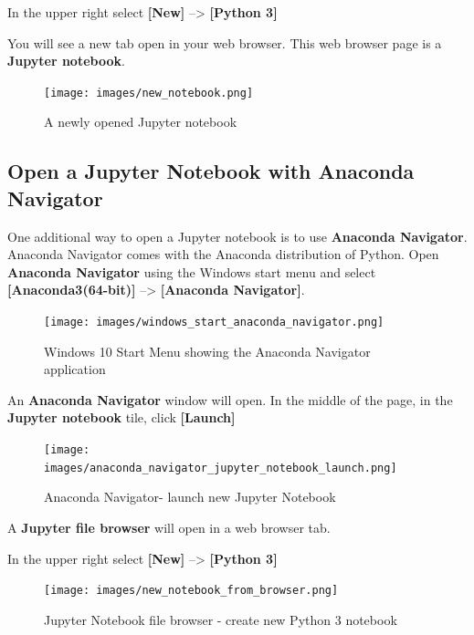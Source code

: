 \documentclass{book}
\begin{document}
In the upper right select \textbf{{[}New{]}} --\textgreater{}
\textbf{{[}Python 3{]}}

You will see a new tab open in your web browser. This web browser page
is a \textbf{Jupyter notebook}.

\begin{figure}
\centering
\texttt{[image: images/new\_notebook.png]}
\caption{A newly opened Jupyter notebook}
\end{figure}
    




    
        \subsection{Open a Jupyter Notebook with Anaconda
Navigator}\label{open-a-jupyter-notebook-with-anaconda-navigator}
    




    
        One additional way to open a Jupyter notebook is to use \textbf{Anaconda
Navigator}. Anaconda Navigator comes with the Anaconda distribution of
Python. Open \textbf{Anaconda Navigator} using the Windows start menu
and select \textbf{{[}Anaconda3(64-bit){]}} --\textgreater{}
\textbf{{[}Anaconda Navigator{]}}.

\begin{figure}
\centering
\texttt{[image: images/windows\_start\_anaconda\_navigator.png]}
\caption{Windows 10 Start Menu showing the Anaconda Navigator
application}
\end{figure}

An \textbf{Anaconda Navigator} window will open. In the middle of the
page, in the \textbf{Jupyter notebook} tile, click \textbf{{[}Launch{]}}

\begin{figure}
\centering
\texttt{[image: images/anaconda\_navigator\_jupyter\_notebook\_launch.png]}
\caption{Anaconda Navigator- launch new Jupyter Notebook}
\end{figure}

A \textbf{Jupyter file browser} will open in a web browser tab.

In the upper right select \textbf{{[}New{]}} --\textgreater{}
\textbf{{[}Python 3{]}}

\begin{figure}
\centering
\texttt{[image: images/new\_notebook\_from\_browser.png]}
\caption{Jupyter Notebook file browser - create new Python 3 notebook}
\end{figure}
\end{document}
